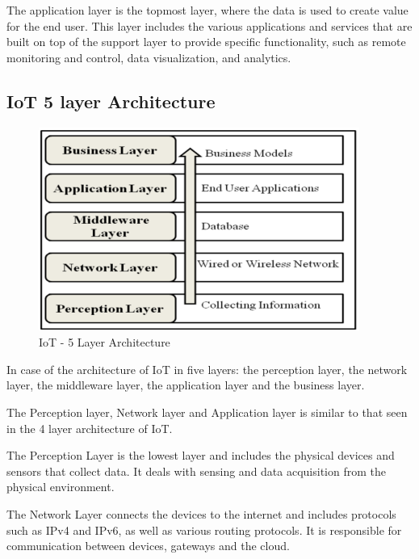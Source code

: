 \documentclass{article}
\begin{document}
The application layer is the topmost layer, where the data is used to create value for the end user. This layer includes the various applications and services that are built on top of the support layer to provide specific functionality, such as remote monitoring and control, data visualization, and analytics.








\subsection{IoT 5 layer Architecture}

\begin{figure}[h!]
    \centering
    \includegraphics[width=\linewidth]{5LayerArch.PNG}
    \caption{IoT - 5 Layer Architecture}
    \label{fig:my_label}
\end{figure}

In case of the architecture of IoT in five layers: the perception layer, the network layer, the middleware layer, the application layer and the business layer.

The Perception layer, Network layer and Application layer is similar to that seen in the 4 layer architecture of IoT.


The Perception Layer is the lowest layer and includes the physical devices and sensors that collect data. It deals with sensing and data acquisition from the physical environment.


The Network Layer connects the devices to the internet and includes protocols such as IPv4 and IPv6, as well as various routing protocols. It is responsible for communication between devices, gateways and the cloud.
\end{document}
